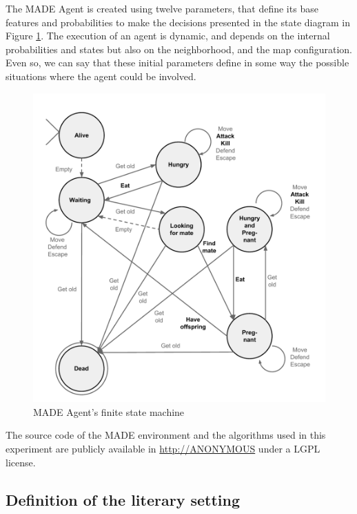 \documentclass[letterpaper]{article}
\begin{document}
The MADE Agent is created using twelve parameters, that define its
base features and probabilities to make the decisions presented in the
state diagram in Figure \ref{fig:fsm}. The execution of an
agent is dynamic, and depends on the internal probabilities and states
but also on the neighborhood, and the map configuration. Even so, we
can say that these initial parameters define in some way the possible
situations where the agent could be involved.

\begin{figure}
\begin{center}
\includegraphics[scale=0.35]{img/fsm.pdf}
\caption{MADE Agent's finite state machine}
\label{fig:fsm}
\end{center}
\end{figure}



The source code of the MADE environment and the algorithms used in this experiment are publicly available in \url{http://ANONYMOUS} under a LGPL license.

\subsection{Definition of the literary setting}
\end{document}
